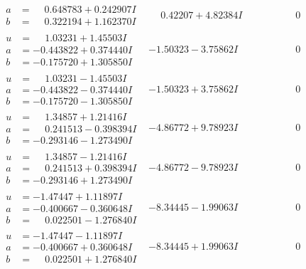 \documentclass[1p]{elsarticle_modified}
\theoremstyle{definition}
\begin{document}
$$\begin{array}{c|c|c}
\begin{aligned}
a &= \phantom{-}0.648783 + 0.242907 I \\
b &= \phantom{-}0.322194 + 1.162370 I\end{aligned}
 & \phantom{-}0.42207 + 4.82384 I & \phantom{-0.000000 } 0 \\ \hline\begin{aligned}
u &= \phantom{-}1.03231 + 1.45503 I \\
a &= -0.443822 + 0.374440 I \\
b &= -0.175720 + 1.305850 I\end{aligned}
 & -1.50323 - 3.75862 I & \phantom{-0.000000 } 0 \\ \hline\begin{aligned}
u &= \phantom{-}1.03231 - 1.45503 I \\
a &= -0.443822 - 0.374440 I \\
b &= -0.175720 - 1.305850 I\end{aligned}
 & -1.50323 + 3.75862 I & \phantom{-0.000000 } 0 \\ \hline\begin{aligned}
u &= \phantom{-}1.34857 + 1.21416 I \\
a &= \phantom{-}0.241513 - 0.398394 I \\
b &= -0.293146 - 1.273490 I\end{aligned}
 & -4.86772 + 9.78923 I & \phantom{-0.000000 } 0 \\ \hline\begin{aligned}
u &= \phantom{-}1.34857 - 1.21416 I \\
a &= \phantom{-}0.241513 + 0.398394 I \\
b &= -0.293146 + 1.273490 I\end{aligned}
 & -4.86772 - 9.78923 I & \phantom{-0.000000 } 0 \\ \hline\begin{aligned}
u &= -1.47447 + 1.11897 I \\
a &= -0.400667 - 0.360648 I \\
b &= \phantom{-}0.022501 - 1.276840 I\end{aligned}
 & -8.34445 - 1.99063 I & \phantom{-0.000000 } 0 \\ \hline\begin{aligned}
u &= -1.47447 - 1.11897 I \\
a &= -0.400667 + 0.360648 I \\
b &= \phantom{-}0.022501 + 1.276840 I\end{aligned}
 & -8.34445 + 1.99063 I & \phantom{-0.000000 } 0 \\ \hline\begin{aligned}

\end{aligned}
\end{array}$$
\end{document}
